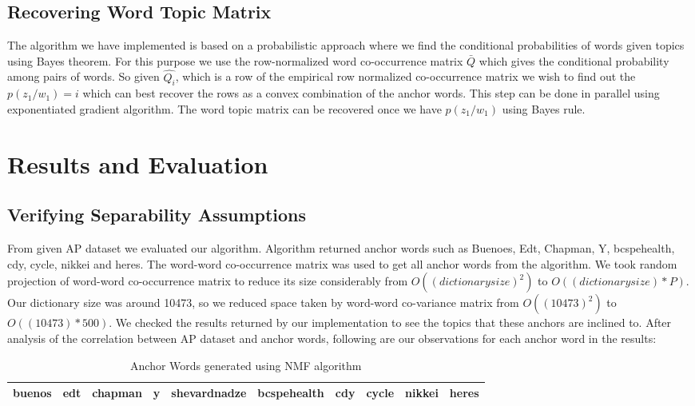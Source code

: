 \documentclass[a4paper,11pt]{article}
\begin{document}
\subsection{Recovering Word Topic Matrix}
The algorithm we have implemented is based on a probabilistic approach where we find the conditional probabilities of words given topics using Bayes theorem. For this purpose we use the row-normalized word co-occurrence matrix $\bar{Q}$ which gives the conditional probability among pairs of words. So given $\hat{Q_{i}}$, which is a row of the empirical row normalized co-occurrence matrix we wish to find out the $p(z_{1}/w_{1})=i$ which can best recover the rows as a convex combination of the anchor words. This step can be done in parallel using exponentiated gradient algorithm. The word topic matrix can be recovered once we have $p(z_{1}/w_{1})$ using Bayes rule. 


\section{Results and Evaluation}

\subsection{Verifying Separability Assumptions}

From given AP dataset we evaluated our algorithm. Algorithm returned anchor words such as Buenoes, Edt, Chapman, Y, bcspehealth, cdy, cycle, nikkei and heres. The word-word co-occurrence matrix was used to get all anchor words from the algorithm. We took random projection of word-word co-occurrence matrix to reduce its size considerably from $O((dictionary size)^2)$ to $O((dictionary size)*P)$. Our dictionary size was around 10473, so we reduced space taken by word-word co-variance matrix from $O((10473)^2)$ to $O((10473)*500)$. We checked the results returned by our implementation to see the topics that these anchors are inclined to. After analysis of the correlation between AP dataset and anchor words, following are our observations for each anchor word in the results:

\begin{table}
    \begin{tabular}{|l|l|l|l|l|l|l|l|l|l|}
    \hline
    buenos & edt & chapman & y & shevardnadze & bcspehealth & cdy & cycle & nikkei & heres \\ \hline
    \end{tabular}
    \caption {Anchor Words generated using NMF algorithm}
\end{table}
\end{document}
